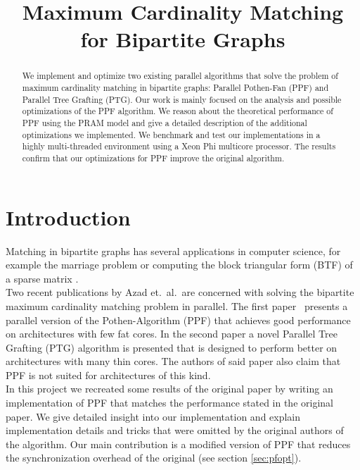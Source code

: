 \documentclass[letterpaper]{article}
\title{Maximum Cardinality Matching for Bipartite Graphs}
\begin{document}
%
\maketitle
%


\begin{abstract}

We implement and optimize two existing parallel algorithms that solve the problem of maximum cardinality matching in bipartite graphs: Parallel Pothen-Fan (PPF) and Parallel Tree Grafting (PTG). Our work is mainly focused on the analysis and possible optimizations of the PPF algorithm. We reason about the theoretical performance of PPF using the PRAM model and give a detailed description of the additional optimizations we implemented. We benchmark and test our implementations in a highly multi-threaded environment using a Xeon Phi multicore processor. The results confirm that our optimizations for PPF improve the original algorithm. 

\end{abstract}

\section{Introduction}\label{sec:intro}

Matching in bipartite graphs has several applications in computer science, for example the marriage problem or computing the block triangular 
form (BTF) of a sparse matrix \cite{Pothen:1990}.\\

Two recent publications by Azad et.\ al.\ are concerned with solving the bipartite maximum cardinality matching problem in parallel. 
The first paper~\cite{Azad:2012} presents a parallel version of the Pothen-Algorithm (PPF) that achieves good performance 
on architectures with few fat cores. In the second paper a novel Parallel Tree Grafting (PTG) algorithm is presented 
that is designed to perform better on architectures with many thin cores. 
The authors of said paper also claim that PPF is not suited for architectures of this kind.\\

In this project we recreated some results of the original paper \cite{Azad:2012} by writing an implementation of PPF
that matches the performance stated in the original paper. We give detailed insight into our implementation and explain
implementation details and tricks that were omitted by the original authors of the algorithm. 
Our main contribution is a modified version of PPF that reduces the synchronization overhead of the original (see section \ref{sec:pfopt}).\\
\end{document}
